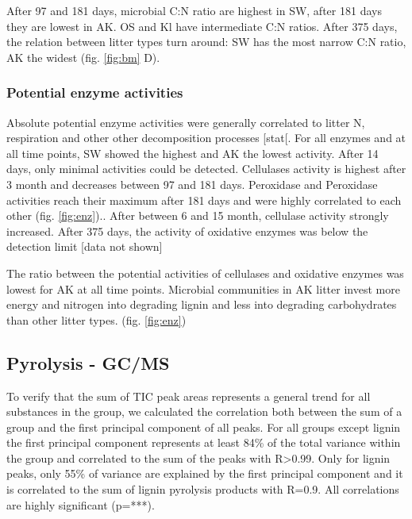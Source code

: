 After 97 and 181 days, microbial C:N ratio are highest in SW, after 181 days they are lowest in AK. OS and Kl have intermediate C:N ratios. After 375 days, the relation between litter types turn around: SW has the most narrow C:N ratio, AK the widest (fig. \ref{fig:bm} D).

\subsubsection{Potential enzyme activities}

Absolute potential enzyme activities were generally correlated to litter N, respiration and other other decomposition processes [stat[. For all enzymes and at all time points, SW showed the highest and AK the lowest activity. After 14 days, only minimal activities could be detected. Cellulases activity is highest after 3 month and decreases between 97 and 181 days. Peroxidase and Peroxidase activities reach their maximum after 181 days and were highly correlated to each other (fig. \ref{fig:enz}).. After between 6 and 15 month, cellulase activity strongly increased. After 375 days, the activity of oxidative enzymes was below the detection limit [data not shown]

The ratio between the potential activities of cellulases and oxidative enzymes was lowest for AK at all time points. Microbial communities in AK litter invest more energy and nitrogen into degrading lignin and less into degrading carbohydrates than other litter types. (fig. \ref{fig:enz})

% 
%  
\subsection{Pyrolysis - GC/MS}



To verify that the sum of TIC peak areas represents a general trend for all substances in the group, we calculated the correlation both between the sum of a group and the first principal component of all peaks. For all groups except lignin the first principal component represents at least 84\% of the total variance within the group and correlated to the sum of the peaks with R\textgreater 0.99. Only for lignin peaks, only 55\% of variance are explained by the first principal component and it is correlated to the sum of lignin pyrolysis products with R=0.9. All correlations are highly significant (p=***). 

